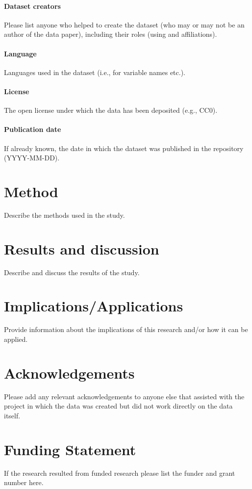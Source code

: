 \documentclass{article}
\begin{document}
\paragraph{Dataset creators} Please list anyone who helped to create the dataset (who may or may not be an author of the data paper), including their roles (using and affiliations).
\paragraph{Language} Languages used in the dataset (i.e., for variable names etc.).
\paragraph{License} The open license under which the data has been deposited (e.g., CC0).  
\paragraph{Publication date} If already known, the date in which the dataset was published in the repository (YYYY-MM-DD).

\section{Method}
Describe the methods used in the study.

\section{Results and discussion}
Describe and discuss the results of the study.

\section{Implications/Applications}
Provide information about the implications of this research and/or how it can be applied.

\section*{Acknowledgements}
Please add any relevant acknowledgements to anyone else that assisted with the project in which the data was created but did not work directly on the data itself.

\section*{Funding Statement}
If the research resulted from funded research please list the funder and grant number here.
\end{document}
